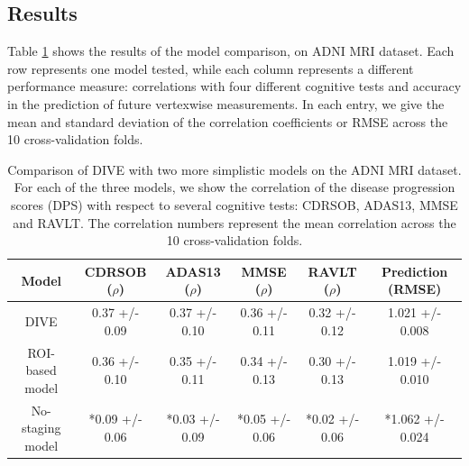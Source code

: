 \subsection{Results}

Table \ref{tab1} shows the results of the model comparison, on ADNI MRI dataset. Each row represents one model tested, while each column represents a different performance measure: correlations with four different cognitive tests and accuracy in the prediction of future vertexwise measurements. In each entry, we give the mean and standard deviation of the correlation coefficients or RMSE across the 10 cross-validation folds.  

\begin{table}[H]
\centering
\begin{footnotesize}
 \begin{tabular}{c | c c c c | c}
  Model & CDRSOB ($\rho$) & ADAS13 ($\rho$) & MMSE ($\rho$) & RAVLT ($\rho$) & Prediction (RMSE)\\
  \hline 
DIVE & 0.37 +/- 0.09 & 0.37 +/- 0.10 & 0.36 +/- 0.11 & 0.32 +/- 0.12 & 1.021 +/- 0.008 \\
ROI-based model & 0.36 +/- 0.10 & 0.35 +/- 0.11 & 0.34 +/- 0.13 & 0.30 +/- 0.13 & 1.019 +/- 0.010 \\
No-staging model & *0.09 +/- 0.06 & *0.03 +/- 0.09 & *0.05 +/- 0.06 & *0.02 +/- 0.06 & *1.062 +/- 0.024 \\

 \end{tabular}
 \end{footnotesize}
 \caption[Comparison of DIVE with two more simplistic models on the ADNI MRI dataset.]{Comparison of DIVE with two more simplistic models on the ADNI MRI dataset. For each of the three models, we show the correlation of the disease progression scores (DPS) with respect to several cognitive tests: CDRSOB, ADAS13, MMSE and RAVLT. The correlation numbers represent the mean correlation across the 10 cross-validation folds. }
 \label{tab1}
\end{table}



